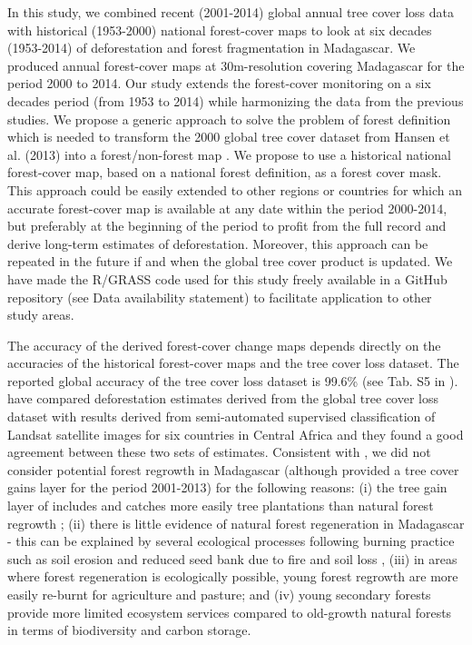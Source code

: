\documentclass[]{article}
\begin{document}
In this study, we combined recent (2001-2014) global annual tree cover
loss data \citep{Hansen2013} with historical (1953-2000) national
forest-cover maps \citep{Harper2007} to look at six decades (1953-2014)
of deforestation and forest fragmentation in Madagascar. We produced
annual forest-cover maps at 30m-resolution covering Madagascar for the
period 2000 to 2014. Our study extends the forest-cover monitoring on a
six decades period (from 1953 to 2014) while harmonizing the data from
the previous studies. We propose a generic approach to solve the problem
of forest definition which is needed to transform the 2000 global tree
cover dataset from Hansen et al. (2013) into a forest/non-forest map
\citep{Tropek2014}. We propose to use a historical national forest-cover
map, based on a national forest definition, as a forest cover mask. This
approach could be easily extended to other regions or countries for
which an accurate forest-cover map is available at any date within the
period 2000-2014, but preferably at the beginning of the period to
profit from the full record and derive long-term estimates of
deforestation. Moreover, this approach can be repeated in the future if
and when the global tree cover product is updated. We have made the
R/GRASS code used for this study freely available in a GitHub repository
(see Data availability statement) to facilitate application to other
study areas.

The accuracy of the derived forest-cover change maps depends directly on
the accuracies of the historical forest-cover maps and the tree cover
loss dataset. The reported global accuracy of the tree cover loss
dataset is 99.6\% (see Tab. S5 in \citet{Hansen2013}).
\citet{Verhegghen2016} have compared deforestation estimates derived
from the global tree cover loss dataset \citep{Hansen2013} with results
derived from semi-automated supervised classification of Landsat
satellite images \citep{Achard2014} for six countries in Central Africa
and they found a good agreement between these two sets of estimates.
Consistent with \citet{Harper2007}, we did not consider potential forest
regrowth in Madagascar (although \citet{Hansen2013} provided a tree
cover gains layer for the period 2001-2013) for the following reasons:
(i) the tree gain layer of \citet{Hansen2013} includes and catches more
easily tree plantations than natural forest regrowth \citep{Tropek2014};
(ii) there is little evidence of natural forest regeneration in
Madagascar \citep[\citet{Grouzis2001}]{Harper2007} - this can be
explained by several ecological processes following burning practice
such as soil erosion \citep{Grinand2017} and reduced seed bank due to
fire and soil loss \citep{Grouzis2001}, (iii) in areas where forest
regeneration is ecologically possible, young forest regrowth are more
easily re-burnt for agriculture and pasture; and (iv) young secondary
forests provide more limited ecosystem services compared to old-growth
natural forests in terms of biodiversity and carbon storage.
\end{document}
